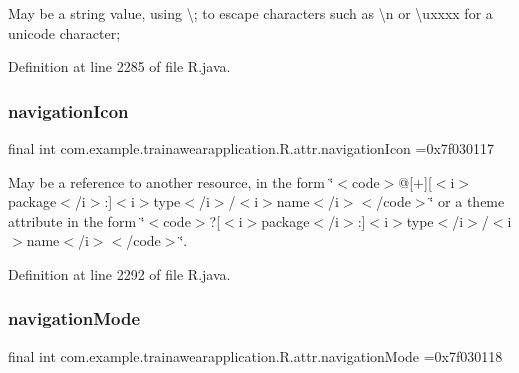 May be a string value, using \textquotesingle{}\textbackslash{};\textquotesingle{} to escape characters such as \textquotesingle{}\textbackslash{}n\textquotesingle{} or \textquotesingle{}\textbackslash{}uxxxx\textquotesingle{} for a unicode character; 

Definition at line 2285 of file R.\+java.

\mbox{\label{classcom_1_1example_1_1trainawearapplication_1_1_r_1_1attr_af1c806903f1c7e9e81cc5f7a8687ce01}} 
\subsubsection{\texorpdfstring{navigationIcon}{navigationIcon}}
{\footnotesize\ttfamily final int com.\+example.\+trainawearapplication.\+R.\+attr.\+navigation\+Icon =0x7f030117\hspace{0.3cm}{\ttfamily [static]}}

May be a reference to another resource, in the form \char`\"{}$<$code$>$@\mbox{[}+\mbox{]}\mbox{[}$<$i$>$package$<$/i$>$\+:\mbox{]}$<$i$>$type$<$/i$>$/$<$i$>$name$<$/i$>$$<$/code$>$\char`\"{} or a theme attribute in the form \char`\"{}$<$code$>$?\mbox{[}$<$i$>$package$<$/i$>$\+:\mbox{]}$<$i$>$type$<$/i$>$/$<$i$>$name$<$/i$>$$<$/code$>$\char`\"{}. 

Definition at line 2292 of file R.\+java.

\mbox{\label{classcom_1_1example_1_1trainawearapplication_1_1_r_1_1attr_a44ddc1f3897306c7893cf19273a9711e}} 
\subsubsection{\texorpdfstring{navigationMode}{navigationMode}}
{\footnotesize\ttfamily final int com.\+example.\+trainawearapplication.\+R.\+attr.\+navigation\+Mode =0x7f030118\hspace{0.3cm}{\ttfamily [static]}}

